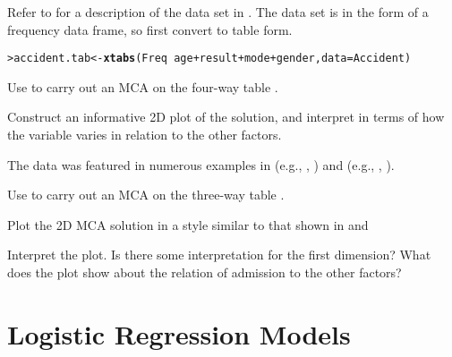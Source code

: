 \documentclass[11pt]{report}\usepackage[]{graphicx}\usepackage[]{color}
\makeatletter
\newcommand{\hlopt}[1]{\textcolor[rgb]{0,0,0}{#1}}%
\newcommand{\hlstd}[1]{\textcolor[rgb]{0.345,0.345,0.345}{#1}}%
\newcommand{\hlkwb}[1]{\textcolor[rgb]{0.69,0.353,0.396}{#1}}%
\newcommand{\hlkwc}[1]{\textcolor[rgb]{0.333,0.667,0.333}{#1}}%
\newcommand{\hlkwd}[1]{\textcolor[rgb]{0.737,0.353,0.396}{\textbf{#1}}}%
\newenvironment{kframe}{%
 \def\at@end@of@kframe{}%
 \ifinner\ifhmode%
  \def\at@end@of@kframe{\end{minipage}}%
  \begin{minipage}{\columnwidth}%
 \fi\fi%
 \def\FrameCommand##1{\hskip\@totalleftmargin \hskip-\fboxsep
 \colorbox{shadecolor}{##1}\hskip-\fboxsep
     \hskip-\linewidth \hskip-\@totalleftmargin \hskip\columnwidth}%
 \MakeFramed {\advance\hsize-\width
   \@totalleftmargin\z@ \linewidth\hsize
   \@setminipage}}%
 {\par\unskip\endMakeFramed%
 \at@end@of@kframe}
\newenvironment{knitrout}{}{} %
\renewenvironment{knitrout}{\small\renewcommand{\baselinestretch}{.85}}{} %
\makeatother
\begin{document}
\begin{Exercises}
\exercise\label{lab:ca-accident} Refer to  for a description of the  data set
  in . The data set is in the form of a frequency data frame, so first convert to table form.
\begin{knitrout}
\color{fgcolor}\begin{kframe}
\begin{alltt}
\hlstd{> }\hlstd{accident.tab} \hlkwb{<-} \hlkwd{xtabs}\hlstd{(Freq} \hlopt{~} \hlstd{age} \hlopt{+} \hlstd{result} \hlopt{+} \hlstd{mode} \hlopt{+} \hlstd{gender,} \hlkwc{data}\hlstd{=Accident)}
\end{alltt}
\end{kframe}
\end{knitrout}

  \begin{enumerate*}
    \item Use  to carry out an MCA on the four-way table .
    \item Construct an informative 2D plot of the solution, and interpret in terms of how the variable 
    varies in relation to the other factors.
  \end{enumerate*}

\exercise The  data was featured in numerous examples in 
(e.g., , )
and  (e.g., , ).
  \begin{enumerate*}
    \item Use  to carry out an MCA on the three-way table .
    \item Plot the 2D MCA solution in a style similar to that shown in 
    and 
    \item Interpret the plot.  Is there some interpretation for the first dimension?
    What does the plot show about the relation of admission to the other factors?
  \end{enumerate*}

\end{Exercises}


\chapter{Logistic Regression Models}\label{ch:logistic}
\end{document}
